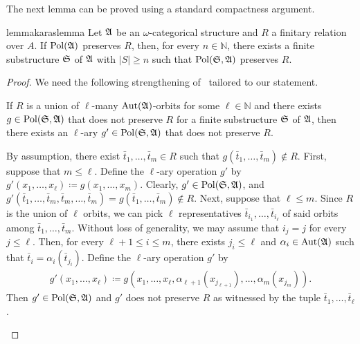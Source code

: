 The next lemma can be proved using a standard compactness argument.
%

\begin{restatable}{lemma}{karaslemma} \label{lem:christoph_lemma} 
Let $\mathfrak{A}$ be an $\omega$-categorical structure and $R$ a finitary relation over $A$. If $\mathrm{Pol}(\mathfrak{A})$ preserves $R$, then, for every $n\in \mathbb{N}$, there exists a finite substructure $\mathfrak{S}$ of $\mathfrak{A}$ with $|S|\geq n$ such that $\mathrm{Pol}(\mathfrak{S},\mathfrak{A})$ preserves $R$.  
 \end{restatable}  
\begin{proof} We need the following strengthening of~\cite[Lemma~10]{ComplOfTempCSPs} tailored to our statement.
%
\begin{claim} \label{claim:kara_plus}
If $R$ is a union of $\ell$-many $\mathrm{Aut}(\mathfrak{A})$-orbits for some $\ell\in\mathbb{N}$ and there exists $g\in \mathrm{Pol}(\mathfrak{S},\mathfrak{A})$ that does not preserve $R$ for a finite substructure $\mathfrak{S}$ of $\mathfrak{A}$, then there exists an $\ell$-ary $g'\in\mathrm{Pol}(\mathfrak{S},\mathfrak{A})$ that does not preserve $R$.
\end{claim}
% 
\begin{claimproof} 
    By assumption, there exist  $\bar{t}_1,\dots,\bar{t}_m\in R$ such that $g(\bar{t}_1,\dots,\bar{t}_m)\notin R$. 
    First, suppose that $m\leq \ell$.
    Define the $\ell$-ary operation $g'$ by $g'(x_1,\dots,x_{\ell}) \coloneqq g(x_1,\dots,x_m)$. 
    Clearly, $g' \in \mathrm{Pol}(\mathfrak{S},\mathfrak{A})$, and $g'(\bar{t}_1,\dots,\bar{t}_m,\bar{t}_m,\dots,\bar{t}_m)=g(\bar{t}_1,\dots,\bar{t}_m)\notin R$.
      Next, suppose that $\ell \leq m$.
        Since $R$ is the union of $\ell$ orbits, we can pick $\ell$ representatives $\bar{t}_{i_1},\dots,\bar{t}_{i_{\ell}}$ of said orbits among $\bar{t}_1,\dots,\bar{t}_m$. 
        Without loss of generality, we may assume that $i_j=j$ for every $j\leq \ell $. 
        Then, for every $\ell +1\leq i\leq m$, there exists $j_i\leq \ell$ and $\alpha_i\in\mathrm{Aut}(\mathfrak{A})$ such that $\bar{t}_i=\alpha_i(\bar{t}_{j_i})$.
        Define the $\ell$-ary  operation $g'$ by 
        \begin{align*}
            g'(x_1,\dots,x_{\ell}) \coloneqq g(x_1,\dots,x_{\ell},\alpha_{\ell +1}(x_{j_{\ell +1}}),\dots,\alpha_m(x_{j_m})).
        \end{align*}
        Then $g'\in\mathrm{Pol}(\mathfrak{S},\mathfrak{A})$ and $g'$ does not preserve $R$ as witnessed by the tuple $\bar{t}_1,\dots,\bar{t}_{\ell}$. 

\end{claimproof}
\end{proof}
